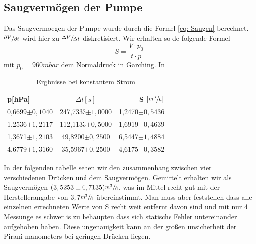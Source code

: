 \documentclass[12pt]{article}
\begin{document}
	\subsection{Saugvermögen der Pumpe}
	Das Saugvermoegen der Pumpe wurde durch die Formel \ref{eq: Saugen} berechnet. $\sfrac{\partial V}{\partial t}$ wird hier zu  $\sfrac{\Delta V}{\Delta t}$ diskretisiert. Wir erhalten so de folgende Formel
	\begin{equation}
		S= \frac{V \cdot p_0}{t\cdot p}
	\end{equation}
	mit $p_0=960mbar$ dem Normaldruck in Garching. 
	In 
	\begin{table} [H]
		\begin{center}
			\caption{Ergbnisse bei konstantem Strom}
			\begin{tabular}{l|c|r}
				\textbf{p[hPa]} & \textbf{$\Delta t [s]$}  & \textbf{S $[\sfrac{m^3}{h}]$}\\
				\hline
				0,6699$\pm{0,1040}$ & 247,7333$\pm{1,0000}$ & 1,2470$\pm{0,5436}$\\
				1,2536$\pm{1,2117}$ & 112,1133$\pm{0,5000}$ & 1,6919$\pm{0,4639}$\\
				1,3671$\pm{1,2103}$ & 49,8200$\pm{0,2500}$  & 6,5447$\pm{1,4884}$\\
				4,6779$\pm{1,3160}$ & 35,5967$\pm{0,2500}$  & 4,6175$\pm{0,3582}$\\
			\end{tabular}
		\end{center}
	\end{table}

	In der folgenden tabelle sehen wir den zusammenhang zwischen vier verschiedenen Drücken und dem Saugvermögen. Gemittelt erhalten wir als Saugvermögen $(3,5253\pm 0,7135)\sfrac{m^3}{h}$, was im Mittel recht gut mit der Herstellerangabe von $3,7\sfrac{m^3}{h}$ übereinstimmt.
	Man muss aber feststellen dass alle einzelnen errechneten Werte von S recht weit entfernt davon sind und mit nur 4 Messunge es schwer is zu behaupten dass sich statische Fehler untereinander aufgehoben haben. Diese ungenauigkeit kann an der großen unsicherheit der Pirani-manometers bei geringen Drücken liegen.
	
\end{document}
